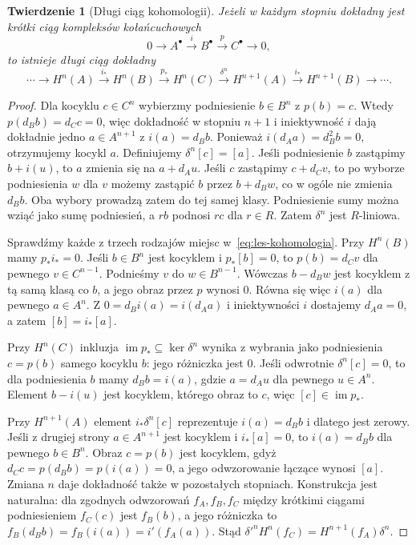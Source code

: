 \documentclass[11pt,a4paper,oneside]{report}
\theoremstyle{plain}
\newtheorem{twierdzenie}{Twierdzenie}[section]
\theoremstyle{definition}
\theoremstyle{remark}
\begin{document}
\begin{twierdzenie}[Długi ciąg kohomologii]
\label{thm:les-kohomologia}
Jeżeli w każdym stopniu dokładny jest
krótki ciąg \emph{kompleksów kołańcuchowych}
\[
 0\longrightarrow A^\bullet\xrightarrow{i}B^\bullet
 \xrightarrow{p}C^\bullet\longrightarrow0,
\]
to istnieje długi ciąg dokładny
\begin{equation}\label{eq:les-kohomologia}
 \cdots\longrightarrow H^n(A)
 \xrightarrow{i_*}H^n(B)
 \xrightarrow{p_*}H^n(C)
 \xrightarrow{\delta^n}H^{n+1}(A)
 \xrightarrow{i_*}H^{n+1}(B)\longrightarrow\cdots.
\end{equation}
\end{twierdzenie}
\begin{proof}
Dla kocyklu $c\in C^n$ wybierzmy podniesienie
$b\in B^n$ z $p(b)=c$.
Wtedy $p(d_Bb)=d_Cc=0$, więc dokładność
w stopniu $n+1$ i iniektywność $i$
dają dokładnie jedno $a\in A^{n+1}$
z $i(a)=d_Bb$.
Ponieważ $i(d_Aa)=d_B^2b=0$,
otrzymujemy kocykl $a$.
Definiujemy $\delta^n[c]=[a]$.
Jeśli podniesienie $b$ zastąpimy $b+i(u)$,
to $a$ zmienia się na $a+d_Au$.
Jeśli $c$ zastąpimy $c+d_Cv$, to po
wyborze podniesienia $w$ dla $v$ możemy
zastąpić $b$ przez $b+d_Bw$,
co w ogóle nie zmienia $d_Bb$.
Oba wybory prowadzą zatem do tej
samej klasy. Podniesienie sumy można wziąć
jako sumę podniesień, a $rb$ podnosi $rc$ dla $r\in R$.
Zatem $\delta^n$ jest $R$-liniowa.

Sprawdźmy każde z trzech rodzajów miejsc
w~\eqref{eq:les-kohomologia}.
Przy $H^n(B)$ mamy $p_*i_*=0$.
Jeśli $b\in B^n$ jest kocyklem
i $p_*[b]=0$, to $p(b)=d_Cv$
dla pewnego $v\in C^{n-1}$.
Podnieśmy $v$ do $w\in B^{n-1}$.
Wówczas $b-d_Bw$ jest kocyklem
z tą samą klasą co $b$, a jego
obraz przez $p$ wynosi $0$.
Równa się więc $i(a)$ dla pewnego
$a\in A^n$. Z $0=d_Bi(a)=i(d_Aa)$
i iniektywności $i$ dostajemy
$d_Aa=0$, a zatem $[b]=i_*[a]$.

Przy $H^n(C)$ inkluzja
$\operatorname{im}p_*\subseteq\ker\delta^n$
wynika z wybrania jako podniesienia $c=p(b)$
samego kocyklu $b$: jego różniczka jest $0$.
Jeśli odwrotnie $\delta^n[c]=0$,
to dla podniesienia $b$ mamy $d_Bb=i(a)$,
gdzie $a=d_Au$ dla pewnego $u\in A^n$.
Element $b-i(u)$ jest kocyklem,
którego obraz to $c$, więc
$[c]\in\operatorname{im}p_*$.

Przy $H^{n+1}(A)$ element
$i_*\delta^n[c]$ reprezentuje
$i(a)=d_Bb$ i dlatego jest zerowy.
Jeśli z drugiej strony $a\in A^{n+1}$
jest kocyklem i $i_*[a]=0$,
to $i(a)=d_Bb$ dla pewnego
$b\in B^n$. Obraz $c=p(b)$ jest
kocyklem, gdyż $d_Cc=p(d_Bb)=p(i(a))=0$,
a jego odwzorowanie łączące wynosi $[a]$.
Zmiana $n$ daje dokładność także
w pozostałych stopniach. Konstrukcja jest naturalna:
dla zgodnych odwzorowań $f_A,f_B,f_C$ między krótkimi ciągami
podniesieniem $f_C(c)$ jest $f_B(b)$, a jego różniczka to
$f_B(d_Bb)=f_B(i(a))=i'(f_A(a))$.
Stąd $\delta'^n H^n(f_C)=H^{n+1}(f_A)\delta^n$.
\end{proof}
\end{document}
